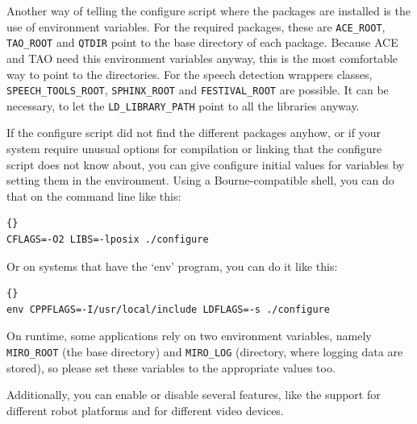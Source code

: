 \documentclass[10pt]{book}
\begin{document}
Another way of telling the configure script where the packages are
installed is the use of environment variables. For the required
packages, these are \texttt{ACE\_ROOT}, \texttt{TAO\_ROOT} and
\texttt{QTDIR} point to the base directory of each package. Because
ACE and TAO need this environment variables anyway, this is the most
comfortable way to point to the directories. For the speech detection
wrappers classes, \texttt{SPEECH\_TOOLS\_ROOT}, \texttt{SPHINX\_ROOT}
and \texttt{FESTIVAL\_ROOT} are possible. It can be necessary, to let
the \texttt{LD\_LIBRARY\_PATH} point to all the libraries anyway.

If the configure script did not find the different packages anyhow, or
if your system require unusual options for compilation or linking that
the configure script does not know about, you can give configure
initial values for variables by setting them in the environment. Using
a Bourne-compatible shell, you can do that on the command line like
this:

\begin{lstlisting}[frame=tb]{}
CFLAGS=-O2 LIBS=-lposix ./configure
\end{lstlisting}

Or on systems that have the `env' program, you can do it like this:

\begin{lstlisting}[frame=tb]{}
env CPPFLAGS=-I/usr/local/include LDFLAGS=-s ./configure
\end{lstlisting}

On runtime, some applications rely on two environment variables,
namely \texttt{MIRO\_ROOT} (the base directory) and \texttt{MIRO\_LOG}
(directory, where logging data are stored), so please set these
variables to the appropriate values too.

Additionally, you can enable or disable several features, like the
support for different robot platforms and for different video devices.
\end{document}
